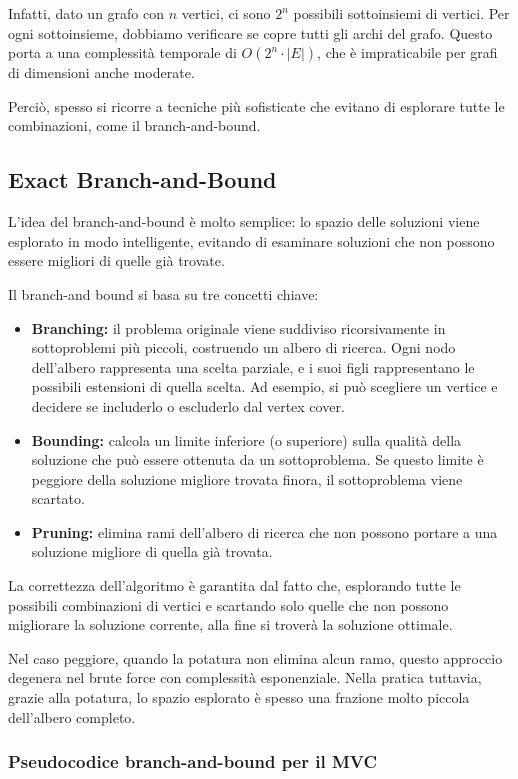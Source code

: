 Infatti, dato un grafo con $n$ vertici, ci sono $2^n$ possibili sottoinsiemi di vertici. Per ogni sottoinsieme, dobbiamo verificare se copre tutti gli archi del grafo. Questo porta a una complessità temporale di $O(2^n \cdot |E|)$, che è impraticabile per grafi di dimensioni anche moderate.

Perciò, spesso si ricorre a tecniche più sofisticate che evitano di esplorare tutte le combinazioni, come il branch-and-bound.


\subsection{Exact Branch-and-Bound} 

L'idea del branch-and-bound è molto semplice: lo spazio delle soluzioni viene esplorato in modo intelligente, evitando di esaminare soluzioni che non possono essere migliori di quelle già trovate.

Il branch-and bound si basa su tre concetti chiave:
\begin{itemize}
    \item \textbf{Branching:} il problema originale viene suddiviso ricorsivamente in sottoproblemi più piccoli, costruendo un albero di ricerca. Ogni nodo dell'albero rappresenta una scelta parziale, e i suoi figli rappresentano le possibili estensioni di quella scelta. Ad esempio, si può scegliere un vertice e decidere se includerlo o escluderlo dal vertex cover.
    \item \textbf{Bounding:} calcola un limite inferiore (o superiore) sulla qualità della soluzione che può essere ottenuta da un sottoproblema. Se questo limite è peggiore della soluzione migliore trovata finora, il sottoproblema viene scartato.
    \item \textbf{Pruning:} elimina rami dell'albero di ricerca che non possono portare a una soluzione migliore di quella già trovata.
\end{itemize}
 La correttezza dell'algoritmo è garantita dal fatto che, esplorando tutte le possibili combinazioni di vertici e scartando solo quelle che non possono migliorare la soluzione corrente, alla fine si troverà la soluzione ottimale.

 Nel caso peggiore, quando la potatura non elimina alcun ramo, questo approccio degenera nel brute force con complessità esponenziale. Nella pratica tuttavia, grazie alla potatura, lo spazio esplorato è spesso una frazione molto piccola dell'albero completo.

 \subsubsection{Pseudocodice branch-and-bound per il MVC}


